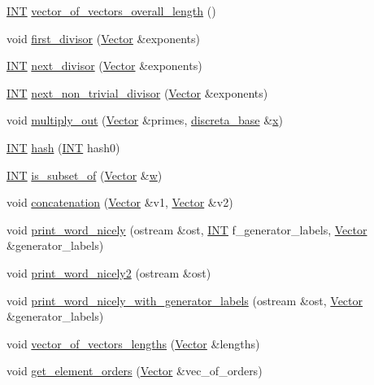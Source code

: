 \begin{DoxyCompactItemize}
\item 
\mbox{\hyperlink{galois_8h_a09fddde158a3a20bd2dcadb609de11dc}{I\+NT}} \mbox{\hyperlink{class_vector_ab8e6d88870a530d57e026fc21ae2d232}{vector\+\_\+of\+\_\+vectors\+\_\+overall\+\_\+length}} ()
\item 
void \mbox{\hyperlink{class_vector_a578b0f528e7ccbe0ed06337c4fea1504}{first\+\_\+divisor}} (\mbox{\hyperlink{class_vector}{Vector}} \&exponents)
\item 
\mbox{\hyperlink{galois_8h_a09fddde158a3a20bd2dcadb609de11dc}{I\+NT}} \mbox{\hyperlink{class_vector_affee742a383eac1ff46a3313ae47dc76}{next\+\_\+divisor}} (\mbox{\hyperlink{class_vector}{Vector}} \&exponents)
\item 
\mbox{\hyperlink{galois_8h_a09fddde158a3a20bd2dcadb609de11dc}{I\+NT}} \mbox{\hyperlink{class_vector_a965dd2d9e91fa94d4fc23cc1c34054f9}{next\+\_\+non\+\_\+trivial\+\_\+divisor}} (\mbox{\hyperlink{class_vector}{Vector}} \&exponents)
\item 
void \mbox{\hyperlink{class_vector_a3f8219c2cb731ff22790f6456753e104}{multiply\+\_\+out}} (\mbox{\hyperlink{class_vector}{Vector}} \&primes, \mbox{\hyperlink{classdiscreta__base}{discreta\+\_\+base}} \&\mbox{\hyperlink{alphabet2_8_c_a6150e0515f7202e2fb518f7206ed97dc}{x}})
\item 
\mbox{\hyperlink{galois_8h_a09fddde158a3a20bd2dcadb609de11dc}{I\+NT}} \mbox{\hyperlink{class_vector_a1eb7508c3c31d85829d0d8361526c770}{hash}} (\mbox{\hyperlink{galois_8h_a09fddde158a3a20bd2dcadb609de11dc}{I\+NT}} hash0)
\item 
\mbox{\hyperlink{galois_8h_a09fddde158a3a20bd2dcadb609de11dc}{I\+NT}} \mbox{\hyperlink{class_vector_a984996de6448206b30f4e12f7021970d}{is\+\_\+subset\+\_\+of}} (\mbox{\hyperlink{class_vector}{Vector}} \&\mbox{\hyperlink{alphabet2_8_c_aac374e320caaadeca4874add33b62af2}{w}})
\item 
void \mbox{\hyperlink{class_vector_a2b29fadd7d7c0df93dd3711f42aff4b9}{concatenation}} (\mbox{\hyperlink{class_vector}{Vector}} \&v1, \mbox{\hyperlink{class_vector}{Vector}} \&v2)
\item 
void \mbox{\hyperlink{class_vector_acf1a607f7a282a128ada9128465ce38f}{print\+\_\+word\+\_\+nicely}} (ostream \&ost, \mbox{\hyperlink{galois_8h_a09fddde158a3a20bd2dcadb609de11dc}{I\+NT}} f\+\_\+generator\+\_\+labels, \mbox{\hyperlink{class_vector}{Vector}} \&generator\+\_\+labels)
\item 
void \mbox{\hyperlink{class_vector_ad8b224e83836e7b1fad7785853a4df79}{print\+\_\+word\+\_\+nicely2}} (ostream \&ost)
\item 
void \mbox{\hyperlink{class_vector_af999a68ef44d55c7c0e7a1eb7889fbba}{print\+\_\+word\+\_\+nicely\+\_\+with\+\_\+generator\+\_\+labels}} (ostream \&ost, \mbox{\hyperlink{class_vector}{Vector}} \&generator\+\_\+labels)
\item 
void \mbox{\hyperlink{class_vector_aaf8be9b0570fb6bd4bde9e549dd0bbc8}{vector\+\_\+of\+\_\+vectors\+\_\+lengths}} (\mbox{\hyperlink{class_vector}{Vector}} \&lengths)
\item 
void \mbox{\hyperlink{class_vector_ac83f27123b1c43f3953b81de0392eae7}{get\+\_\+element\+\_\+orders}} (\mbox{\hyperlink{class_vector}{Vector}} \&vec\+\_\+of\+\_\+orders)
\end{DoxyCompactItemize}
